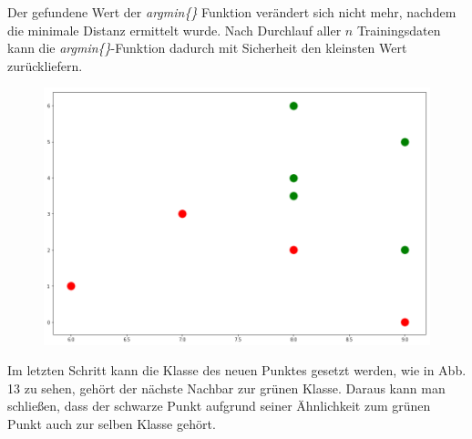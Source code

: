\documentclass[fontsize=11pt]{scrartcl}
\begin{document}
                        
              	Der gefundene Wert der \emph{argmin\{\}} Funktion verändert sich nicht mehr, nachdem die minimale Distanz ermittelt wurde. Nach Durchlauf aller $n$ Trainingsdaten kann die \emph{argmin\{\}}-Funktion dadurch mit Sicherheit den kleinsten Wert zurückliefern.\par 
               	\begin{figure}
                       \includegraphics[scale=0.3]{nn6.png}
                \end{figure}
                
                Im letzten Schritt kann die Klasse des neuen Punktes gesetzt werden, wie in Abb. 13 zu sehen, gehört der nächste Nachbar zur grünen Klasse. Daraus kann man schließen, dass der schwarze Punkt aufgrund seiner Ähnlichkeit zum grünen Punkt auch zur selben Klasse gehört.\par
                        
\end{document}
